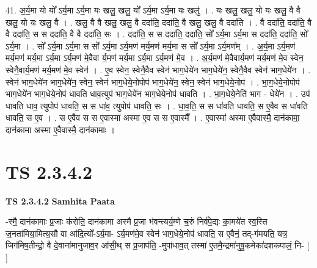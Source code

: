 \documentclass[17pt]{extarticle}
\begin{document}
41. अ॒र्य॒मा यो यो᳚ ऽर्य॒मा ऽर्य॒मा यः खलु॒ खलु॒ यो᳚ ऽर्य॒मा ऽर्य॒मा यः खलु॑ । . यः खलु॒ खलु॒ यो यः खलु॒ वै वै खलु॒ यो यः खलु॒ वै । . खलु॒ वै वै खलु॒ खलु॒ वै ददा॑ति॒ ददा॑ति॒ वै खलु॒ खलु॒ वै ददा॑ति । . वै ददा॑ति॒ ददा॑ति॒ वै वै ददा॑ति॒ स स ददा॑ति॒ वै वै ददा॑ति॒ सः । . ददा॑ति॒ स स ददा॑ति॒ ददा॑ति॒ सो᳚ ऽर्य॒मा ऽर्य॒मा स ददा॑ति॒ ददा॑ति॒ सो᳚ ऽर्य॒मा । . सो᳚ ऽर्य॒मा ऽर्य॒मा स सो᳚ ऽर्य॒मा ऽर्य॒मण॑ मर्य॒मण॑ मर्य॒मा स सो᳚ ऽर्य॒मा ऽर्य॒मण᳚म् । . अ॒र्य॒मा ऽर्य॒मण॑ मर्य॒मण॑ मर्य॒मा ऽर्य॒मा ऽर्य॒मण॑ मे॒वैवा र्य॒मण॑ मर्य॒मा ऽर्य॒मा ऽर्य॒मण॑ मे॒व । . अ॒र्य॒मण॑ मे॒वैवार्य॒मण॑ मर्य॒मण॑ मे॒व स्वेन॒ स्वेनै॒वार्य॒मण॑ मर्य॒मण॑ मे॒व स्वेन॑ । . ए॒व स्वेन॒ स्वेनै॒वैव स्वेन॑ भाग॒धेये॑न भाग॒धेये॑न॒ स्वेनै॒वैव स्वेन॑ भाग॒धेये॑न । . स्वेन॑ भाग॒धेये॑न भाग॒धेये॑न॒ स्वेन॒ स्वेन॑ भाग॒धेये॒नोपोप॑ भाग॒धेये॑न॒ स्वेन॒ स्वेन॑ भाग॒धेये॒नोप॑ । . भा॒ग॒धेये॒नोपोप॑ भाग॒धेये॑न भाग॒धेये॒नोप॑ धावति धाव॒त्युप॑ भाग॒धेये॑न भाग॒धेये॒नोप॑ धावति । . भा॒ग॒धेये॒नेति॑ भाग - धेये॑न । . उप॑ धावति धाव॒ त्युपोप॑ धावति॒ स स धा॑व॒ त्युपोप॑ धावति॒ सः । . धा॒व॒ति॒ स स धा॑वति धावति॒ स ए॒वैव स धा॑वति धावति॒ स ए॒व । . स ए॒वैव स स ए॒वास्मा॑ अस्मा ए॒व स स ए॒वास्मै᳚ । . ए॒वास्मा॑ अस्मा ए॒वैवास्मै॒ दान॑कामा॒ दान॑कामा अस्मा ए॒वैवास्मै॒ दान॑कामाः । \newline
\pagebreak
{}
\section*{ TS 2.3.4.2 }

\textbf{TS 2.3.4.2 } \newline
\textbf{Samhita Paata} \newline

-स्मै॒ दान॑कामाः प्र॒जाः क॑रोति॒ दान॑कामा अस्मै प्र॒जा भ॑वन्त्यर्य॒म्णे च॒रुं निर्व॑पे॒द्यः का॒मये॑त स्व॒स्ति ज॒नता॑मिया॒मित्य॒सौ वा आ॑दि॒त्यो᳚-ऽर्य॒मा- ऽर्य॒मण॑मे॒व स्वेन॑ भाग॒धेये॒नोप॑ धावति॒ स ए॒वैनं॒ तद्-ग॑मयति॒ यत्र॒ जिग॑मिष॒तीन्द्रो॒ वै दे॒वाना॑मानुजाव॒र आ॑सी॒थ् स प्र॒जाप॑ति॒ -मुपा॑धाव॒त् तस्मा॑ ए॒तमै॒न्द्रमा॑नुषू॒कमेका॑दशकपालं॒ नि- [  ] \newline
\end{document}
